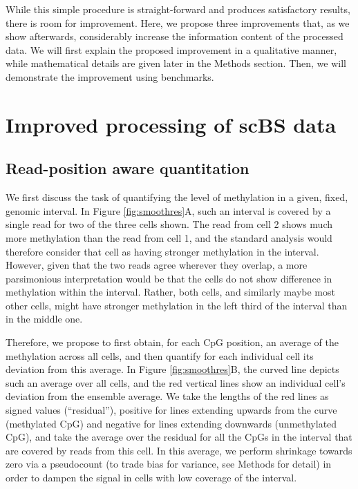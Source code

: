 \documentclass[twocolumn,10pt]{article}
\begin{document}
While this simple procedure is straight-forward and produces satisfactory results, there is room for improvement. Here, we propose three improvements that, as we show afterwards, considerably increase the information content of the processed data. We will first explain the proposed improvement in a qualitative manner, while mathematical details are given later in the Methods section. Then, we will demonstrate the improvement using benchmarks.

\section{Improved processing of scBS data}

\subsection{Read-position aware quantitation} \label{residuals}

We first discuss the task of quantifying the level of methylation in a given, fixed, genomic interval. In Figure \ref{fig:smoothres}A, such an interval is covered by a single read for two of the three cells shown. The read from cell 2 shows much more methylation than the read from cell 1, and the standard analysis would therefore consider that cell as having stronger methylation in the interval. However, given that the two reads agree wherever they overlap, a more parsimonious interpretation would be that the cells do not show difference in methylation within the interval. Rather, both cells, and similarly maybe most other cells, might have stronger methylation in the left third of the interval than in the middle one.

Therefore, we propose to first obtain, for each CpG position, an average of the methylation across all cells, and then quantify for each individual cell its deviation from this average. In Figure \ref{fig:smoothres}B, the curved line depicts such an average over all cells, and the red vertical lines show an individual cell's deviation from the ensemble average. We take the lengths of the red lines as signed values (``residual''), positive for lines extending upwards from the curve (methylated CpG) and negative for lines extending downwards (unmethylated CpG), and take the average over the residual for all the CpGs in the interval that are covered by reads from this cell. In this average, we perform shrinkage towards zero via a pseudocount (to trade bias for variance, see Methods for detail) in order to dampen the signal in cells with low coverage of the interval.
\end{document}

